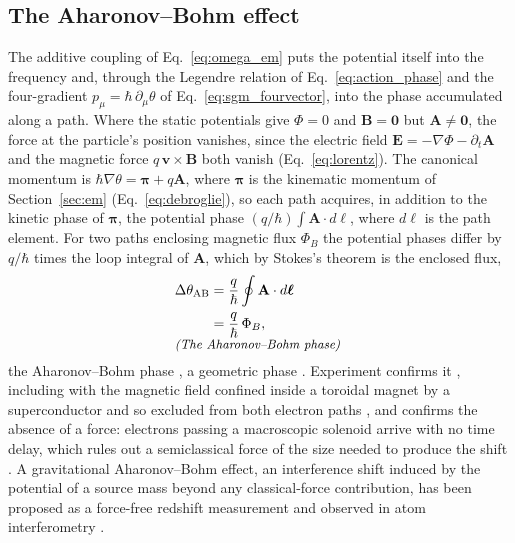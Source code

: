 \documentclass[aps,prd,onecolumn,tightenlines,nofootinbib,notitlepage,11pt,floatfix]{revtex4-2}
\theoremstyle{indentedtheorem}
\begin{document}
\subsection{The Aharonov--Bohm effect}
\label{sec:ab}

The additive coupling of Eq.~\eqref{eq:omega_em} puts the potential itself into the frequency and, through the Legendre relation of Eq.~\eqref{eq:action_phase} and the four-gradient $p_\mu=\hbar\,\partial_\mu\theta$ of Eq.~\eqref{eq:sgm_fourvector}, into the phase accumulated along a path. Where the static potentials give $\Phi=0$ and $\mathbf{B}=\mathbf{0}$ but $\mathbf{A}\neq\mathbf{0}$, the force at the particle's position vanishes, since the electric field $\mathbf{E}=-\nabla\Phi-\partial_t\mathbf{A}$ and the magnetic force $q\,\mathbf{v}\times\mathbf{B}$ both vanish (Eq.~\eqref{eq:lorentz}). The canonical momentum is $\hbar\nabla\theta=\boldsymbol{\pi}+q\mathbf{A}$, where $\boldsymbol{\pi}$ is the kinematic momentum of Section~\ref{sec:em} (Eq.~\eqref{eq:debroglie}), so each path acquires, in addition to the kinetic phase of $\boldsymbol{\pi}$, the potential phase $(q/\hbar)\int\mathbf{A}\cdot d\boldsymbol{\ell}$, where $d\boldsymbol{\ell}$ is the path element. For two paths enclosing magnetic flux $\Phi_B$ the potential phases differ by $q/\hbar$ times the loop integral of $\mathbf{A}$, which by Stokes's theorem is the enclosed flux,
\begin{align}
    \Delta\theta_\text{AB} &= \frac{q}{\hbar}\oint \mathbf{A}\cdot d\boldsymbol{\ell} \notag\\
    &= \frac{q}{\hbar}\,\Phi_B ,
    \label{eq:ab} \\[-3pt]
    \multispan2{\hfil\text{\small\itshape (The Aharonov--Bohm phase)}\hfil} \notag
\end{align}
the Aharonov--Bohm phase \citep{Aharonov1959Significance}, a geometric phase \citep{Berry1984Quantal}. Experiment confirms it \citep{Chambers1960Shift}, including with the magnetic field confined inside a toroidal magnet by a superconductor and so excluded from both electron paths \citep{Tonomura1986Evidence}, and confirms the absence of a force: electrons passing a macroscopic solenoid arrive with no time delay, which rules out a semiclassical force of the size needed to produce the shift \citep{Caprez2007Macroscopic}. A gravitational Aharonov--Bohm effect, an interference shift induced by the potential of a source mass beyond any classical-force contribution, has been proposed as a force-free redshift measurement \citep{Hohensee2012Force} and observed in atom interferometry \citep{Overstreet2022Observation}.
\end{document}
